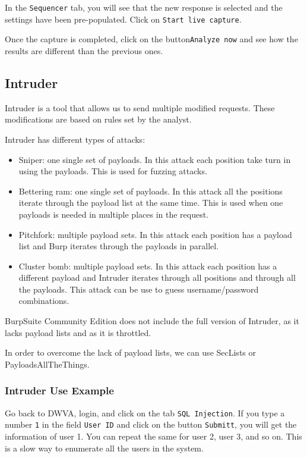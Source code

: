 \documentclass[twocolumn]{article}
\begin{document}
In the \texttt{Sequencer} tab, you will see that the new response is selected and the settings have been pre-populated. Click on \texttt{Start live capture}.

Once the capture is completed, click on the button\texttt{Analyze now} and see how the results are different than the previous ones.

\subsection{Intruder}

Intruder is a tool that allows us to send multiple modified requests. These modifications are based on rules set by the analyst.

Intruder has different types of attacks\cite{burpintruder}:

\begin{itemize}
    \item Sniper: one single set of payloads. In this attack each position take turn in using the payloads. This is used for fuzzing attacks.
    \item Bettering ram: one single set of payloads. In this attack all the positions iterate through the payload list at the same time. This is used when one payloads is needed in multiple places in the request.
    \item Pitchfork: multiple payload sets. In this attack each position has a payload list and Burp iterates through the payloads in parallel.
    \item Cluster bomb: multiple payload sets. In this attack each position has a different payload and Intruder iterates through all positions and through all the payloads. This attack can be use to guess username/password combinations. 
\end{itemize}

BurpSuite Community Edition does not include the full version of Intruder, as it lacks payload lists and as it is throttled.

In order to overcome the lack of payload lists, we can use SecLists\cite{seclists} or PayloadsAllTheThings\cite{playloadsallthethings}.


\subsubsection{Intruder Use Example}

Go back to DWVA, login, and click on the tab \texttt{SQL Injection}. If you type a number \texttt{1} in the field \texttt{User ID} and click on the button \texttt{Submitt}, you will get the information of user 1. You can repeat the same for user 2, user 3, and so on. This is a slow way to enumerate all the users in the system.
\end{document}
